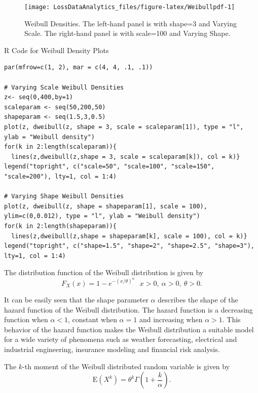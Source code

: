\documentclass[]{book}
\theoremstyle{definition}
\theoremstyle{definition}
\theoremstyle{definition}
\theoremstyle{remark}
\begin{document}
\begin{figure}

{\centering \texttt{[image: LossDataAnalytics\_files/figure-latex/Weibullpdf-1]} 

}

\caption{Weibull Densities. The left-hand panel is with shape=3 and Varying Scale. The right-hand panel is with scale=100 and Varying Shape.}\label{fig:Weibullpdf}
\end{figure}

R Code for Weibull Density Plots

\hypertarget{display.ux20Weibullscale.2}{}
\begin{verbatim}
par(mfrow=c(1, 2), mar = c(4, 4, .1, .1))

# Varying Scale Weibull Densities
z<- seq(0,400,by=1)
scaleparam <- seq(50,200,50)
shapeparam <- seq(1.5,3,0.5)
plot(z, dweibull(z, shape = 3, scale = scaleparam[1]), type = "l", ylab = "Weibull density")
for(k in 2:length(scaleparam)){
  lines(z,dweibull(z,shape = 3, scale = scaleparam[k]), col = k)}
legend("topright", c("scale=50", "scale=100", "scale=150", "scale=200"), lty=1, col = 1:4)

# Varying Shape Weibull Densities
plot(z, dweibull(z, shape = shapeparam[1], scale = 100), ylim=c(0,0.012), type = "l", ylab = "Weibull density")
for(k in 2:length(shapeparam)){
  lines(z,dweibull(z,shape = shapeparam[k], scale = 100), col = k)}
legend("topright", c("shape=1.5", "shape=2", "shape=2.5", "shape=3"), lty=1, col = 1:4)
\end{verbatim}

The distribution function of the Weibull distribution is given by
\[F_{X}\left( x \right) = 1 - e^{- \left( x / \theta \right)^{\alpha}}  \ \ \ x >  0,\ \alpha >  0,\ \theta > 0.\]

It can be easily seen that the shape parameter \(\alpha\) describes the
shape of the hazard function of the Weibull distribution. The hazard
function is a decreasing function when \(\alpha < 1\), constant when
\(\alpha = 1\) and increasing when \(\alpha > 1\). This behavior of the
hazard function makes the Weibull distribution a suitable model for a
wide variety of phenomena such as weather forecasting, electrical and
industrial engineering, insurance modeling and financial risk analysis.

The \(k\)-th moment of the Weibull distributed random variable is given
by
\[\mathrm{E}\left( X^{k} \right) = \theta^{k}\Gamma\left( 1 + \frac{k}{\alpha} \right) .\]
\end{document}
